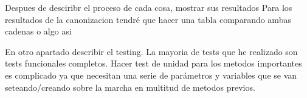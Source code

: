 Despues de desciribr el proceso de cada cosa, mostrar sus resultados
Para los resultados de la canonizacion tendré que hacer una tabla comparando ambas cadenas o algo asi

 En otro apartado describir el testing. La mayoria de tests que he realizado son tests funcionales completos. Hacer test de unidad para los metodos importantes es complicado ya que necesitan una serie de parámetros y variables que se van seteando/creando sobre la marcha en multitud de metodos previos.


